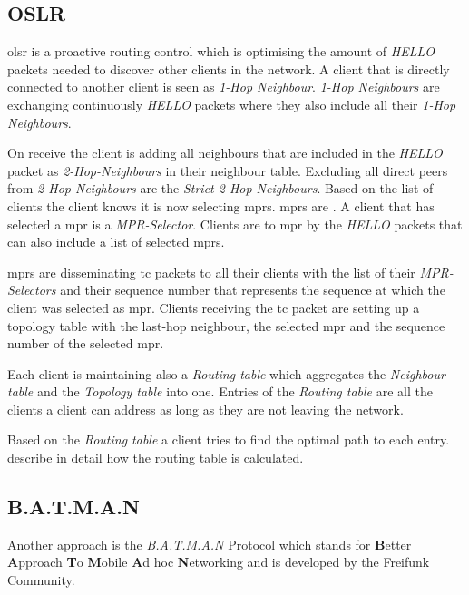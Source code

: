 \subsection{OSLR}
\gls{olsr} is a proactive routing control which is optimising the amount of \textit{HELLO} packets needed to discover other clients in the network.
A client that is directly connected to another client is seen as \textit{1-Hop Neighbour}. \textit{1-Hop Neighbours} are exchanging continuously \textit{HELLO} packets where they also include all their \textit{1-Hop Neighbours}.

On receive the client is adding all neighbours that are included in the \textit{HELLO} packet as \textit{2-Hop-Neighbours} in their neighbour table. Excluding all direct peers from \textit{2-Hop-Neighbours} are the \textit{Strict-2-Hop-Neighbours}.
Based on the list of clients the client knows it is now selecting \glspl{mpr}. \Glspl{mpr} are \cite[\S1.4]{rfc-oslr}. A client that has selected a \gls{mpr} is a \textit{MPR-Selector}. Clients are  to \gls{mpr} by the \textit{HELLO} packets that can also include a list of selected \glspl{mpr}.

\Glspl{mpr} are disseminating \gls{tc} packets to all their clients with the list of their \textit{MPR-Selectors} and their sequence number that represents the sequence at which the client was selected as \gls{mpr}.
Clients receiving the \gls{tc} packet are setting up a topology table with the last-hop neighbour, the selected \gls{mpr} and the sequence number of the selected \gls{mpr}.

Each client is maintaining also a \textit{Routing table} which aggregates the \textit{Neighbour table} and the \textit{Topology table} into one. Entries of the \textit{Routing table} are all the clients a client can address as long as they are not leaving the network. 

Based on the \textit{Routing table} a client tries to find the optimal path to each entry. \citet[\S4.4]{jacquet_muhlethaler_clausen_laouiti_qayyum_viennot} describe in detail how the routing table is calculated.

\subsection{B.A.T.M.A.N}
Another approach is the \textit{B.A.T.M.A.N} Protocol which stands for \textbf{B}etter \textbf{A}pproach \textbf{T}o \textbf{M}obile \textbf{A}d hoc \textbf{N}etworking and is developed by the Freifunk Community.

